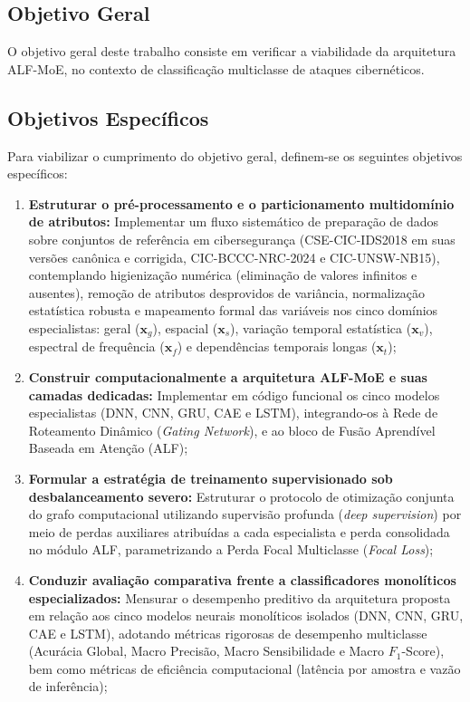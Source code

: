 \subsection{Objetivo Geral}
\label{subsec:obj_geral}

O objetivo geral deste trabalho consiste em verificar a viabilidade da arquitetura ALF-MoE, no contexto de classificação multiclasse de ataques cibernéticos.

\subsection{Objetivos Específicos}
\label{subsec:obj_especificos}

Para viabilizar o cumprimento do objetivo geral, definem-se os seguintes objetivos específicos:
\begin{enumerate}
    \item \textbf{Estruturar o pré-processamento e o particionamento multidomínio de atributos:} Implementar um fluxo sistemático de preparação de dados sobre conjuntos de referência em cibersegurança (CSE-CIC-IDS2018 em suas versões canônica e corrigida, CIC-BCCC-NRC-2024 e CIC-UNSW-NB15), contemplando higienização numérica (eliminação de valores infinitos e ausentes), remoção de atributos desprovidos de variância, normalização estatística robusta e mapeamento formal das variáveis nos cinco domínios especialistas: geral ($\mathbf{x}_g$), espacial ($\mathbf{x}_s$), variação temporal estatística ($\mathbf{x}_v$), espectral de frequência ($\mathbf{x}_f$) e dependências temporais longas ($\mathbf{x}_t$);
    \item \textbf{Construir computacionalmente a arquitetura ALF-MoE e suas camadas dedicadas:} Implementar em código funcional os cinco modelos especialistas (DNN, CNN, GRU, CAE e LSTM), integrando-os à Rede de Roteamento Dinâmico (\emph{Gating Network}), e ao bloco de Fusão Aprendível Baseada em Atenção (ALF);
    \item \textbf{Formular a estratégia de treinamento supervisionado sob desbalanceamento severo:} Estruturar o protocolo de otimização conjunta do grafo computacional utilizando supervisão profunda (\emph{deep supervision}) por meio de perdas auxiliares atribuídas a cada especialista e perda consolidada no módulo ALF, parametrizando a Perda Focal Multiclasse (\emph{Focal Loss});
    \item \textbf{Conduzir avaliação comparativa frente a classificadores monolíticos especializados:} Mensurar o desempenho preditivo da arquitetura proposta em relação aos cinco modelos neurais monolíticos isolados (DNN, CNN, GRU, CAE e LSTM), adotando métricas rigorosas de desempenho multiclasse (Acurácia Global, Macro Precisão, Macro Sensibilidade e Macro $F_1$-Score), bem como métricas de eficiência computacional (latência por amostra e vazão de inferência);

\end{enumerate}
